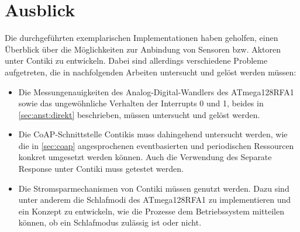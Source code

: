 \section{Ausblick}
	Die durchgeführten exemplarischen Implementationen haben geholfen,
	einen Überblick über die Möglichkeiten zur Anbindung von Sensoren
	bzw. Aktoren unter Contiki zu entwickeln.  Dabei sind allerdings
	verschiedene Probleme aufgetreten, die in nachfolgenden Arbeiten
	untersucht und gelöst werden müssen:
	\begin{itemize}
	\item	Die Messungenauigkeiten des Analog-Digital-Wandlers des
		ATmega128RFA1 sowie das ungewöhnliche Verhalten der
		Interrupts 0 und 1, beides in \autoref{sec:anst:direkt}
		beschrieben, müssen untersucht und gelöst werden.
	\item	Die CoAP-Schnittstelle Contikis muss dahingehend untersucht
		werden, wie die in \autoref{sec:coap} angesprochenen
		eventbasierten und periodischen Ressourcen konkret umgesetzt
		werden können.  Auch die Verwendung des Separate Response
		unter Contiki muss getestet werden.
	\item	Die Stromsparmechanismen von Contiki
		\autocite{ritter05experimental, dunkels07softwarebased}
		müssen genutzt werden.
		Dazu sind unter anderem die Schlafmodi des ATmega128RFA1 zu
		implementieren und ein Konzept zu entwickeln, wie die Prozesse
		dem Betriebssystem mitteilen können, ob ein Schlafmodus
		zulässig ist oder nicht.
	\end{itemize}
